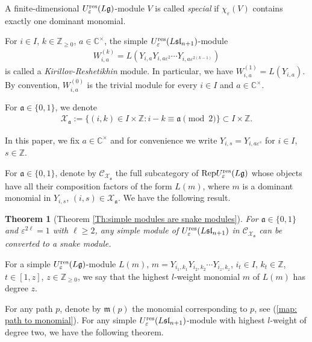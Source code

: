 \documentclass[12pt, reqno]{amsart}
\newtheorem{theorem}{Theorem}[section]
\numberwithin{equation}{section}
\newcommand{\CC}{\mathbb{C}}
\newcommand{\ZZ}{\mathbb{Z}}
\newcommand{\res}{{\rm res}}
\begin{document}
A finite-dimensional $U_\varepsilon^{\res}(L\mathfrak{g})$-module $V$ is called \textit{special} if $\chi_{\varepsilon}(V)$ contains exactly one dominant monomial.

For $i\in I$, $k\in \mathbb{Z}_{\geq 0}$, $a\in\mathbb{C^{\times}}$, the simple $U_{\varepsilon}^{\res}({L\mathfrak{sl}_{n+1}})$-module
\begin{align}
W_{i,a}^{(k)}=L(Y_{i,a}Y_{i,a\varepsilon^2}\cdots Y_{i,a\varepsilon^{2(k-1)}})
\end{align}
is called a \textit{Kirillov-Reshetikhin} module. In particular, we have $W_{i,a}^{(1)}=L(Y_{i,a})$. By convention, $W_{i,a}^{(0)}$ is the trivial module for every $i \in I$ and $a \in \CC^{\times}$.

For $\mathfrak{a} \in \{0, 1\}$, we denote
\begin{align*}
\mathcal{X}_{\mathfrak{a}}:=\{(i,k)\in I \times \mathbb{Z}: i-k \equiv \mathfrak{a}  \pmod 2\} \subset I \times \mathbb{Z}.
\end{align*}

In this paper, we fix $a \in \CC^{\times}$ and for convenience we write $Y_{i,s}=Y_{i,a\varepsilon^s}$ for $i \in I$, $s \in \mathbb{Z}$.

For $\mathfrak{a} \in \{0,1\}$, denote by $\mathcal{C}_{\mathcal{X}_{\mathfrak{a}}}$ the full subcategory of ${\rm Rep}U_\varepsilon^{\res}({L\mathfrak{g}})$ whose objects have all their composition factors of the form $L(m)$, where $m$ is a dominant monomial in $Y_{i,s}$, $(i,s) \in \mathcal{X}_{\mathfrak{a}}$. We have the following result.
\begin{theorem}[Theorem \ref{Th:simple modules are snake modules}]
For $\mathfrak{a} \in \{0,1\}$ and $\varepsilon^{2\ell}=1$ with $\ell \ge 2$, any simple module of $U_{\varepsilon}^{\res}({L\mathfrak{sl}_{n+1}})$ in $\mathcal{C}_{\mathcal{X}_{\mathfrak{a}}}$ can be converted to a snake module.
\end{theorem}

For a simple $U_{\varepsilon}^{\res}({L\mathfrak{g}})$-module $L(m)$, $m=Y_{i_1,k_1}Y_{i_2,k_2} \cdots Y_{i_z,k_z}$, $i_t\in I$, $k_t \in \mathbb{Z}$, $t \in [1,z]$, $z \in \ZZ_{\ge 0}$, we say that the highest $l$-weight monomial $m$ of $L(m)$ has degree $z$.

For any path $p$, denote by $\mathfrak{m}(p)$ the monomial corresponding to $p$, see (\ref{map: path to monomial}). For any simple $U_{\varepsilon}^{\res}({L\mathfrak{sl}_{n+1}})$-module with highest $l$-weight of degree two, we have the following theorem.
\end{document}
